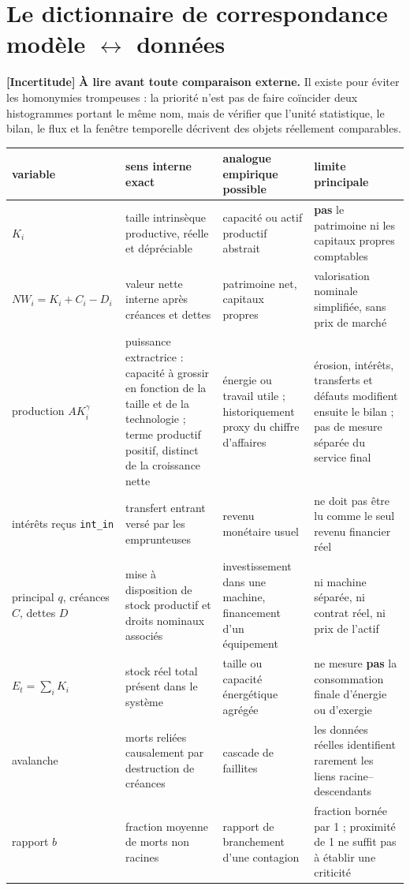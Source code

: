 \documentclass[11pt,a4paper]{article}
\newcommand{\code}[1]{\texttt{#1}}
\newcommand{\incertitude}{\textbf{[Incertitude]}}
\begin{document}
\clearpage

\clearpage
\appendix




\section{Le dictionnaire de correspondance modèle $\leftrightarrow$ données}
\label{sec:dictionnaire}

\incertitude{} \textbf{À lire avant toute comparaison externe.} Il existe pour
éviter les homonymies trompeuses : la priorité n'est pas de faire coïncider
deux histogrammes portant le même nom, mais de vérifier que l'unité
statistique, le bilan, le flux et la fenêtre temporelle décrivent des objets
réellement comparables.

\begin{longtable}{@{}p{}p{}p{}p{}@{}}
\toprule
\textbf{variable} & \textbf{sens interne exact} &
\textbf{analogue empirique possible} & \textbf{limite principale} \\
\midrule
\endhead
$K_i$ & taille intrinsèque productive, réelle et dépréciable &
  capacité ou actif productif abstrait &
  \textbf{pas} le patrimoine ni les capitaux propres comptables \\
$NW_i = K_i + C_i - D_i$ & valeur nette interne après créances et dettes &
  patrimoine net, capitaux propres &
  valorisation nominale simplifiée, sans prix de marché \\
production $A K_i^\gamma$ &
  puissance extractrice : capacité à grossir en fonction de la taille et de la
  technologie ; terme productif positif, distinct de la croissance nette &
  énergie ou travail utile ; historiquement proxy du chiffre d'affaires &
  érosion, intérêts, transferts et défauts modifient ensuite le bilan ; pas de
  mesure séparée du service final \\
intérêts reçus \code{int\_in} & transfert entrant versé par les emprunteuses &
  revenu monétaire usuel &
  ne doit pas être lu comme le seul revenu financier réel \\
principal $q$, créances $C$, dettes $D$ &
  mise à disposition de stock productif et droits nominaux associés &
  investissement dans une machine, financement d'un équipement &
  ni machine séparée, ni contrat réel, ni prix de l'actif \\
$E_t = \sum_i K_i$ & stock réel total présent dans le système &
  taille ou capacité énergétique agrégée &
  ne mesure \textbf{pas} la consommation finale d'énergie ou d'exergie \\
avalanche & morts reliées causalement par destruction de créances &
  cascade de faillites &
  les données réelles identifient rarement les liens racine--descendants \\
rapport $b$ & fraction moyenne de morts non racines &
  rapport de branchement d'une contagion &
  fraction bornée par 1 ; proximité de 1 ne suffit pas à établir une criticité \\
\bottomrule
\end{longtable}
\end{document}
